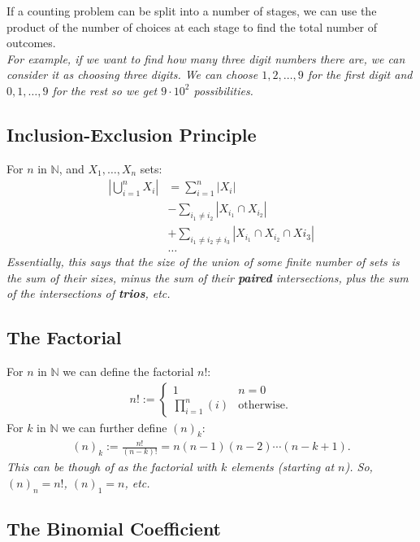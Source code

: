 \documentclass[a4paper, 12pt, twoside]{article}
\begin{document}
If a counting problem can be split into a number of stages, we can
use the product of the number of choices at each stage to find
the total number of outcomes.
\\[\baselineskip]
\textit{For example, if we want to find how many three digit numbers 
there are, we can consider it as choosing three digits. We can choose
$1, 2, \ldots, 9$ for the first digit and $0, 1, \ldots, 9$ for 
the rest so we get $9 \cdot 10^2$ possibilities.}

\subsection{Inclusion-Exclusion Principle}

For $n$ in $\mathbb{N}$, and $X_1, \ldots, X_n$ sets: \begin{align*}
  \left|\bigcup_{i = 1}^n X_i\right| &= \sum_{i = 1}^n |X_i| \\
  &-\sum_{i_1 \neq i_2} |X_{i_1} \cap X_{i_2}| \\
  &+\sum_{i_1 \neq i_2 \neq i_3} |X_{i_1} \cap X_{i_2} \cap X{i_3}| \\
  &\ldots
\end{align*} \textit{Essentially, this says that the size of the
union of some finite number of sets is the sum of their sizes,
minus the sum of their \textbf{paired} intersections,
plus the sum of the intersections of \textbf{trios}, etc.}

\subsection{The Factorial}

For $n$ in $\mathbb{N}$ we can define the factorial $n!$: \begin{align*}
  n! := \begin{cases*}
    1 & n = 0 \\
    \prod_{i = 1}^n(i) & \text{otherwise.}
  \end{cases*}
\end{align*} For $k$ in $\mathbb{N}$ we can further define $(n)_k$: \begin{gather*}
  (n)_k := \frac{n!}{(n-k)!} = n(n-1)(n-2)\cdots(n-k+1).
\end{gather*} \textit{This can be though of as the factorial with $k$
elements (starting at $n$). So, $(n)_n = n!$, $(n)_1 = n$, etc.}

\subsection{The Binomial Coefficient}
\end{document}
